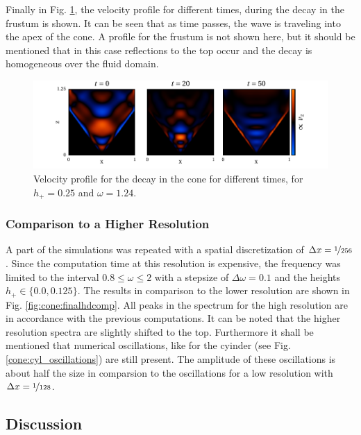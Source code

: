 Finally in Fig. \ref{fig:cone:decayphaseexample}, the velocity profile for different times, during the decay in
the frustum is shown.
It can be seen that as time passes, the wave is traveling into the apex of the cone.
A profile for the frustum is not shown here, but it should be mentioned that in this case reflections to the top occur
and the decay is homogeneous over the fluid domain.

\begin{figure}[!b]
  \centering
  \includegraphics{gfx/cone/final/decay/phase_decay.pdf}
  \caption{
      \label{fig:cone:decayphaseexample}
        Velocity profile for the decay in the cone for different times, for $h_+=0.25$ and $\omega=1.24$.
    }
\end{figure}

\subsubsection{Comparison to a Higher Resolution}

A part of the simulations was repeated with a spatial discretization of $\Delta x= \nicefrac{1}{256}$.
Since the computation time at this resolution is expensive, the frequency was limited
to the interval $0.8\leq\omega\leq2$ with a stepsize of $\Delta \omega = 0.1$ and the heights
$h_+\in\{0.0, 0.125\}$.
The results in comparison to the lower resolution are shown in Fig. \ref{fig:cone:finalhdcomp}.
All peaks in the spectrum for the high resolution are in accordance with the previous computations.
It can be noted that the higher resolution spectra are slightly shifted to the top.
Furthermore it shall be mentioned that numerical oscillations, like for the cyinder
(see Fig. \ref{cone:cyl_oscillations}) are still present.
The amplitude of these oscillations is about half the size in comparsion to the oscillations for
a low resolution with $\Delta x = \nicefrac{1}{128}$.

\subsection{Discussion}%


